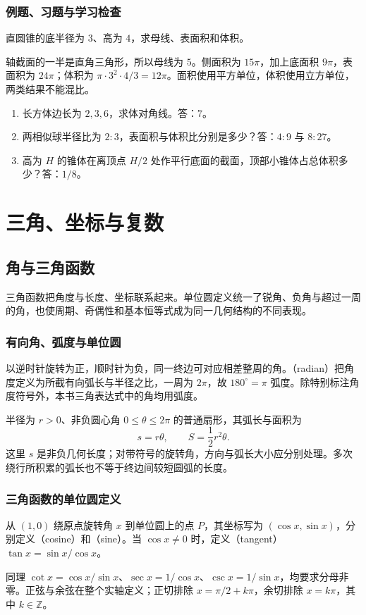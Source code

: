 \documentclass[UTF8]{ctexbook}
\begin{document}
\section{例题、习题与学习检查}
\begin{example}
直圆锥的底半径为 $3$、高为 $4$，求母线、表面积和体积。
\end{example}
\begin{solve}
轴截面的一半是直角三角形，所以母线为 $5$。侧面积为 $15\pi$，加上底面积 $9\pi$，表面积为 $24\pi$；体积为 $\pi\cdot3^2\cdot4/3=12\pi$。面积使用平方单位，体积使用立方单位，两类结果不能混比。
\end{solve}
\begin{enumerate}
\item 长方体边长为 $2,3,6$，求体对角线。答：$7$。
\item 两相似球半径比为 $2:3$，表面积与体积比分别是多少？答：$4:9$ 与 $8:27$。
\item 高为 $H$ 的锥体在离顶点 $H/2$ 处作平行底面的截面，顶部小锥体占总体积多少？答：$1/8$。
\end{enumerate}

\part{三角、坐标与复数}

\chapter{角与三角函数}
\label{chap:em-trigonometry}
三角函数把角度与长度、坐标联系起来。单位圆定义统一了锐角、负角与超过一周的角，也使周期、奇偶性和基本恒等式成为同一几何结构的不同表现。

\section{有向角、弧度与单位圆}
以逆时针旋转为正，顺时针为负，同一终边可对应相差整周的角。（radian）把角度定义为所截有向弧长与半径之比，一周为 $2\pi$，故 $180^\circ=\pi$ 弧度。除特别标注角度符号外，本书三角表达式中的角均用弧度。

半径为 $r>0$、非负圆心角 $0\le\theta\le2\pi$ 的普通扇形，其弧长与面积为
\[
 s=r\theta,\qquad S=\frac12r^2\theta.
\]
这里 $s$ 是非负几何长度；对带符号的旋转角，方向与弧长大小应分别处理。多次绕行所积累的弧长也不等于终边间较短圆弧的长度。

\section{三角函数的单位圆定义}
\begin{definition}
从 $(1,0)$ 绕原点旋转角 $x$ 到单位圆上的点 $P$，其坐标写为 $(\cos x,\sin x)$，分别定义（cosine）和（sine）。当 $\cos x\ne0$ 时，定义（tangent）$\tan x=\sin x/\cos x$。
\end{definition}
同理 $\cot x=\cos x/\sin x$、$\sec x=1/\cos x$、$\csc x=1/\sin x$，均要求分母非零。正弦与余弦在整个实轴定义；正切排除 $x=\pi/2+k\pi$，余切排除 $x=k\pi$，其中 $k\in\mathbb Z$。
\end{document}
